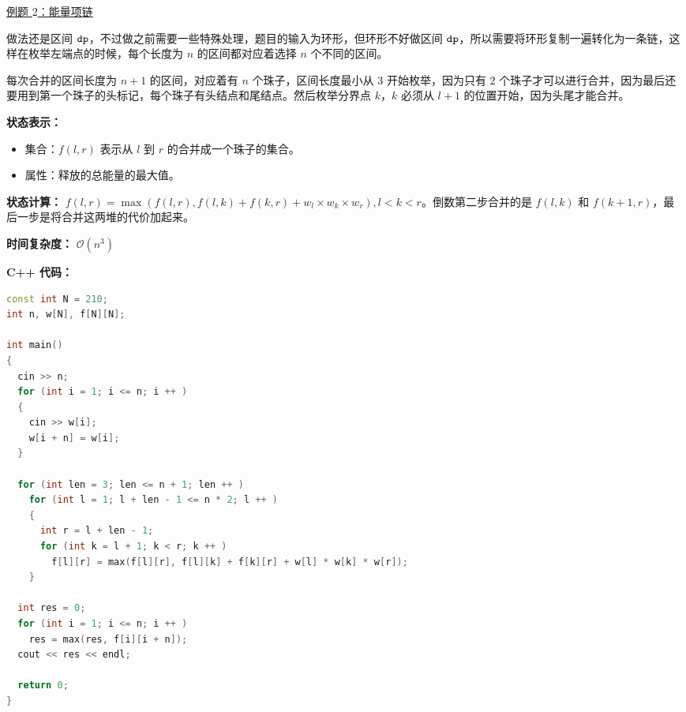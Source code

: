 \href{https://www.luogu.com.cn/problem/P1063}{例题 $2$：能量项链}

做法还是区间 $\tt dp$，不过做之前需要一些特殊处理，题目的输入为环形，但环形不好做区间 $\tt dp$，所以需要将环形复制一遍转化为一条链，这样在枚举左端点的时候，每个长度为 $n$ 的区间都对应着选择 $n$ 个不同的区间。

每次合并的区间长度为 $n + 1$ 的区间，对应着有 $n$ 个珠子，区间长度最小从 $3$ 开始枚举，因为只有 $2$ 个珠子才可以进行合并，因为最后还要用到第一个珠子的头标记，每个珠子有头结点和尾结点。然后枚举分界点 $k$，$k$ 必须从 $l + 1$ 的位置开始，因为头尾才能合并。

\textbf{状态表示：}
\begin{itemize}
\item 集合：$f(l, r)$ 表示从 $l$ 到 $r$ 的合并成一个珠子的集合。
\item 属性：释放的总能量的最大值。
\end{itemize}

\textbf{状态计算：} $f(l, r) = \max(f(l, r), f(l, k) + f(k, r) + w_l \times w_k \times w_r), l < k < r$。倒数第二步合并的是 $f(l, k)$ 和 $f(k + 1, r)$，最后一步是将合并这两堆的代价加起来。

\textbf{时间复杂度：} $\mathcal{O}(n^3)$

\textbf{C++ 代码：}

\begin{lstlisting}[language=cpp]
const int N = 210;
int n, w[N], f[N][N];

int main()
{
  cin >> n;
  for (int i = 1; i <= n; i ++ )
  {
    cin >> w[i];
    w[i + n] = w[i];
  }
  
  for (int len = 3; len <= n + 1; len ++ )
    for (int l = 1; l + len - 1 <= n * 2; l ++ )
    {
      int r = l + len - 1;
      for (int k = l + 1; k < r; k ++ )
        f[l][r] = max(f[l][r], f[l][k] + f[k][r] + w[l] * w[k] * w[r]);
    }
  
  int res = 0;
  for (int i = 1; i <= n; i ++ )
    res = max(res, f[i][i + n]);
  cout << res << endl;

  return 0;
}
\end{lstlisting}